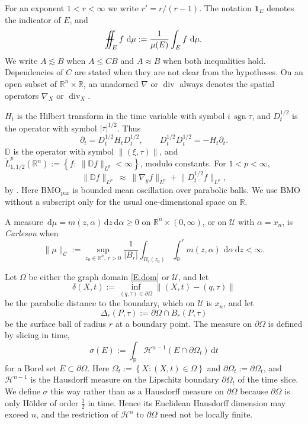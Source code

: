 \documentclass[10pt,a4paper]{amsart}
\numberwithin{equation}{section}
\DeclareMathOperator{\divg}{div}
\newcommand{\R}{\mathbb R}
\newcommand{\abs}[1]{\left\vert#1\right\vert}
\newcommand{\br}[1]{\left(#1\right)}
\newcommand{\set}[1]{\left\{#1\right\}}
\newcommand{\om}{\Omega}
\newcommand{\pom}{\partial\Omega}
\newcommand{\pd}{\partial}
\newcommand{\dhalf}{D_t^{1/2}}
\newcommand{\HT}{H_t}
\newcommand{\BMO}{\mathrm{BMO}}
\newcommand{\BMOpar}{\mathrm{BMO}_{\mathrm{par}}}
\newcommand{\Dpar}{\mathbb D}
\newcommand{\Uc}{\mathcal U}
\newcommand{\Cc}{\mathcal C}
\renewcommand{\d}{\,\mathrm d}
\newcommand{\Cnorm}[1]{\|#1\|_{\Cc}}
\def\Yint#1{\mathchoice
	{\YYint\displaystyle\textstyle{#1}}%
	{\YYint\textstyle\scriptstyle{#1}}%
	{\YYint\scriptstyle\scriptscriptstyle{#1}}%
	{\YYint\scriptscriptstyle\scriptscriptstyle{#1}}%
	\!\dint}
\newcommand{\dint}{\int\!\!\!\!\!\int}
\def\YYint#1#2#3{{\setbox0=\hbox{$#1{#2#3}{\iint}$}
		\vcenter{\hbox{$#2#3$}}\kern-.51\wd0}}
\def\longdash{\mkern-1.5mu{-}\mkern-7.5mu{-}}
\def\fiint{\Yint\longdash}
\begin{document}
For an exponent $1<r<\infty$ we write $r'=r/(r-1)$. The notation
$\mathbf1_E$ denotes the indicator of $E$, and
\[
 \fiint_E f\,\d\mu:=\frac1{\mu(E)}\int_E f\,\d\mu.
\]
We write $A\lesssim B$ when $A\le CB$ and $A\approx B$ when both inequalities
hold. Dependencies of $C$ are stated when they are not clear from the
hypotheses. On an open subset of $\R^n\times\R$, an unadorned $\nabla$ or
$\divg$ always denotes the spatial operators $\nabla_X$ or $\divg_X$.

$\HT$ is the Hilbert transform in the time variable with symbol
$i\,\operatorname{sgn}\tau$, and $\dhalf$ is the operator with symbol
$\abs\tau^{1/2}$. Thus
\begin{equation}\label{E.algebra}
  \pd_t=\dhalf\HT\dhalf,\qquad \dhalf\dhalf=-\HT\pd_t .
\end{equation}
$\Dpar$ is the operator with symbol $\|(\xi,\tau)\|$, and
$\dot L^p_{1,1/2}(\R^n):=\set{f:\ \|\Dpar f\|_{L^p}<\infty}$, modulo constants.
For $1<p<\infty$,
\begin{equation}\label{E.norms}
  \|\Dpar f\|_{L^p}\ \approx\ \|\nabla_yf\|_{L^p}+\big\|\dhalf f\big\|_{L^p} ,
\end{equation}
by \cite[(2.10)]{DN}. Here $\BMOpar$ is bounded mean oscillation over
parabolic balls. We use $\BMO$ without a subscript only for the usual
one-dimensional space on $\R$.

A measure $\d\mu=m(z,\alpha)\d z\d\alpha\ge0$ on
$\R^n\times(0,\infty)$, or on $\Uc$ with $\alpha=x_n$, is \emph{Carleson}
when
\[
 \Cnorm\mu:=\sup_{z_0\in\R^n,\,r>0}\frac1{\abs{B_r}}
 \int_{B_r(z_0)}\int_0^r m(z,\alpha)\,\d\alpha\d z<\infty.
\]

Let $\om$ be either the graph domain \eqref{E.dom} or $\Uc$, and let
$$\delta(X,t):=\inf_{(q,\tau)\in\pom}\big\|(X,t)-(q,\tau)\big\|$$
be the parabolic distance to the boundary, which on $\Uc$ is $x_n$, and let
\begin{equation}\label{E.surfball}
  \Delta_r(P,\tau):=\pom\cap B_r(P,\tau)
\end{equation}
be the surface ball of radius $r$ at a boundary point. The measure on $\pom$ is
defined by slicing in time,
\begin{equation}\label{E.sigma}
  \sigma(E):=\int_\R\mathcal H^{n-1}\br{E\cap\pom_t}\d t
\end{equation}
for a Borel set $E\subset\pom$. Here
$\om_t:=\set{X:(X,t)\in\om}$ and $\pom_t:=\pd\om_t$, and
$\mathcal H^{n-1}$ is the Hausdorff measure on the Lipschitz boundary
$\pom_t$ of the time slice. We define $\sigma$ this way
rather than as a Hausdorff measure on $\pom$ because $\pom$ is only H\"older of
order $\tfrac12$ in time. Hence its Euclidean Hausdorff dimension may exceed
$n$, and the restriction of $\mathcal H^n$ to $\pom$ need not be locally
finite.\medskip
\end{document}
